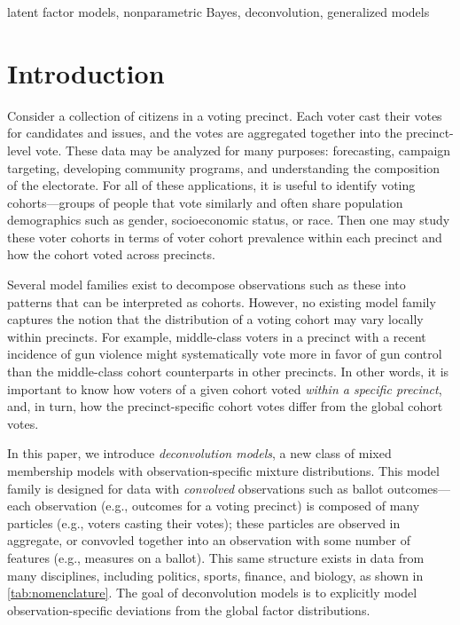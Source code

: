 \documentclass[twoside,11pt]{article}
\begin{document}
\begin{keywords}
latent factor models, nonparametric Bayes, deconvolution, generalized models
\end{keywords}

\section{Introduction}
Consider a collection of citizens in a voting precinct.  Each voter cast their votes for candidates and issues, and the votes are aggregated together into the precinct-level vote.  These data may be analyzed for many purposes: forecasting, campaign targeting, developing community programs, and understanding the composition of the electorate.  For all of these applications, it is useful to identify voting cohorts---groups of people that vote similarly and often share population demographics such as gender, socioeconomic status, or race. Then one may study these voter cohorts in terms of voter cohort prevalence within each precinct and how the cohort voted across precincts.

Several model families exist to decompose observations such as these into patterns that can be interpreted as cohorts.  However, no existing model family captures the notion that the distribution of a voting cohort may vary locally within precincts.  For example, middle-class voters in a precinct with a recent incidence of gun violence might systematically vote more in favor of gun control than the middle-class cohort counterparts in other precincts.  In other words, it is important to know how voters of a given cohort voted \emph{within a specific precinct}, and, in turn, how the precinct-specific cohort votes differ from the global cohort votes.

In this paper, we introduce \emph{deconvolution models}, a new class of mixed membership models with observation-specific mixture distributions.  This model family is designed for data with \emph{convolved} observations such as ballot outcomes---each observation (e.g., outcomes for a voting precinct) is composed of many particles (e.g., voters casting their votes); these particles are observed in aggregate, or convovled together into an observation with some number of features (e.g., measures on a ballot).  This same structure exists in data from many disciplines, including politics, sports, finance, and biology, as shown in \cref{tab:nomenclature}. The goal of deconvolution models is to explicitly model observation-specific deviations from the global factor distributions.
\end{document}
